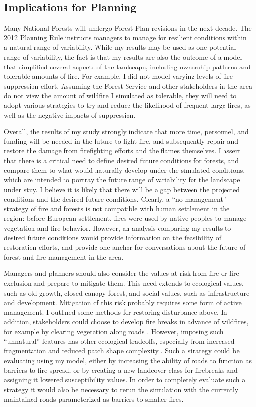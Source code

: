\subsection{Implications for Planning}
Many National Forests will undergo Forest Plan revisions in the next decade. The 2012 Planning Rule instructs managers to manage for resilient conditions within a natural range of variability. While my results may be used as one potential range of variability, the fact is that my results are also the outcome of a model that simplified several aspects of the landscape, including ownership patterns and tolerable amounts of fire. For example, I did not model varying levels of fire suppression effort. Assuming the Forest Service and other stakeholders in the area do not view the amount of wildfire I simulated as tolerable, they will need to adopt various strategies to try and reduce the likelihood of frequent large fires, as well as the negative impacts of suppression. 

Overall, the results of my study strongly indicate that more time, personnel, and funding will be needed in the future to fight fire, and subsequently repair and restore the damage from firefighting efforts and the flames themselves. I assert that there is a critical need to define desired future conditions for forests, and compare them to what would naturally develop under the simulated conditions, which are intended to portray the future range of variability for the landscape under stuy. I believe it is likely that there will be a gap between the projected conditions and the desired future conditions. Clearly, a ``no-management'' strategy of fire and forests is not compatible with human settlement in the region: before European settlement, fires were used by native peoples to manage vegetation and fire behavior. However, an analysis comparing my results to desired future conditions would provide information on the feasibility of restoration efforts, and provide one anchor for conversations about the future of forest and fire management in the area.

Managers and planners should also consider the values at risk from fire or fire exclusion and prepare to mitigate them. This need extends to ecological values, such as old growth, closed canopy forest, and social values, such as infrastructure and development. Mitigation of this risk probably requires some form of active management. I outlined some methods for restoring disturbance above. In addition, stakeholders could choose to develop fire breaks in advance of wildfires, for example by clearing vegetation along roads \citep{Conard2003}. However, imposing such ``unnatural'' features has other ecological tradeoffs, especially from increased fragmentation and reduced patch shape complexity \citep{Trombulak2000}. Such a strategy could be evaluating using my model, either by increasing the ability of roads to function as barriers to fire spread, or by creating a new landcover class for firebreaks and assigning it lowered susceptibility values. In order to completely evaluate such a strategy it would also be necessary to rerun the simulation with the currently maintained roads parameterized as barriers to smaller fires.

